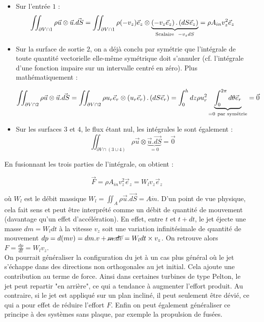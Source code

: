 \begin{itemize}
    \item Sur l'entrée $1$ : 
    \begin{equation}
        \iint_{\partial V \cap 1} \rho \vec{u} \otimes \vec{u}.\vec{dS} = \iint_{\partial V \cap 1} \rho (-v_z) \vec{e}_z \otimes \underbrace{\left( -v_z \vec{e}_z \right).\left(dS \vec{e}_z\right)}_{\textnormal{Scalaire } ~ -v_z dS} = \rho A_{in} v_z^2 \vec{e}_z
    \end{equation}
    
    \item Sur la surface de sortie $2$, on a déjà conclu par symétrie que l'intégrale de toute quantité vectorielle elle-même symétrique doit s'annuler (cf. l'intégrale d'une fonction impaire sur un intervalle centré en zéro). Plus mathématiquement :
    
    \begin{equation}
        \iint_{\partial V \cap 2} \rho \vec{u} \otimes \vec{u}.\vec{dS} = \iint_{\partial V \cap 2} \rho u_r \vec{e}_r \otimes \left(u_r \vec{e}_r\right) . \left(dS \vec{e}_r \right) = \int_0^h dz \rho u_r^2 \underbrace{\int_0^{2\pi} d\theta \vec{e}_r}_{= 0 ~ \textnormal{par symétrie}} = \vec{0}
    \end{equation}
    \item Sur les surfaces $3$ et $4$, le flux étant nul, les intégrales le sont également :
    \begin{equation}
        \iint_{\partial V \cap (3 \cup 4)} \rho \vec{u} \otimes \underbrace{\vec{u}.\vec{dS}}_{= 0 } = \vec{0}
    \end{equation}
\end{itemize}

En fusionnant les trois parties de l'intégrale, on obtient :

\begin{equation}
    \vec{F} = \rho A_{in} v_z^2 \vec{e}_z = W_l v_z \vec{e}_z
\end{equation}

où $W_l$ est le débit massique $W_l = \iint_A \rho \vec{u}.\vec{dS} = A \dot{m}$. D'un point de vue physique, cela fait sens et peut être interprété comme un débit de quantité de mouvement (davantage qu'un effet d'accélération). En effet, entre $t$ et $t+dt$, le jet éjecte une masse $dm = W_l dt$ à la vitesse $v_z$ soit une variation infinitésimale de quantité de mouvement $dp = d(mv) = dm . v + \cancel{m. dv} = W_l dt \times v_z$. On retrouve alors $F = \frac{dp}{dt} = W_l v_z$.\\

On pourrait généraliser la configuration du jet à un cas plus général où le jet s'échappe dans des directions non orthogonales au jet initial. Cela ajoute une contribution au terme de force. Ainsi dans certaines turbines de type Pelton, le jet peut repartir "en arrière", ce qui a tendance à augmenter l'effort produit. Au contraire, si le jet est appliqué sur un plan incliné, il peut seulement être dévié, ce qui a pour effet de réduire l'effort $F$. Enfin on peut également généraliser ce principe à des systèmes sans plaque, par exemple la propulsion de fusées.\\
